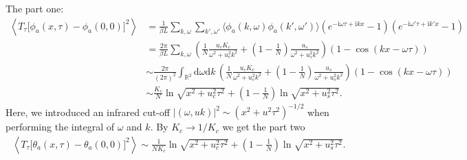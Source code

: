 \documentclass[10pt]{extarticle}
\newcommand{\dd}{\mathrm{d}}
\newcommand{\ii}{\mathrm{i}}
\begin{document}
The part one:
\begin{align*}
	\left\langle T_\tau\bigl[\phi_a(x,\tau)-\phi_a(0,0)\bigr]^2\right\rangle
	&=\frac{1}{\beta L}\sum_{k,\omega}\sum_{k',\omega'}\langle \phi_a(k,\omega)\phi_a(k',\omega')\rangle (e^{-\ii \omega\tau+\ii k x}-1)(e^{-\ii \omega'\tau+\ii k' x}-1)\\
	&=\frac{2\pi}{\beta L}\sum_{k,\omega}\left(\frac{1}{N}\frac{u_c K_c}{\omega^2+u_c^2k^2}+\left(1-\frac{1}{N}\right)\frac{u_s}{\omega^2+u_s^2k^2}\right)(1-\cos(kx-\omega\tau))\\
	&\sim \frac{2\pi}{(2\pi)^2}\int_{\mathbb{R}^2} \dd\omega\dd k\,\left(\frac{1}{N}\frac{u_c K_c}{\omega^2+u_c^2k^2}+\left(1-\frac{1}{N}\right)\frac{u_s}{\omega^2+u_s^2k^2}\right)(1-\cos(kx-\omega\tau))\\
	&\sim \frac{K_c}{N} \ln \sqrt{x^2+u_c^2\tau^2}+\left(1-\frac{1}{N}\right) \ln \sqrt{x^2+u_s^2\tau^2}.
\end{align*}
Here, we introduced an infrared cut-off $|(\omega,uk)|^2\sim (x^2+u^2 \tau^2)^{-1/2}$ when performing the integral of $\omega$ and $k$. By $K_c\to 1/K_c$ we get the part two
\begin{align*}
	\left\langle T_\tau\bigl[\theta_a(x,\tau)-\theta_a(0,0)\bigr]^2\right\rangle\sim \frac{1}{N K_c} \ln \sqrt{x^2+u_c^2\tau^2}+\left(1-\frac{1}{N}\right) \ln \sqrt{x^2+u_s^2\tau^2}.
\end{align*}
\end{document}
